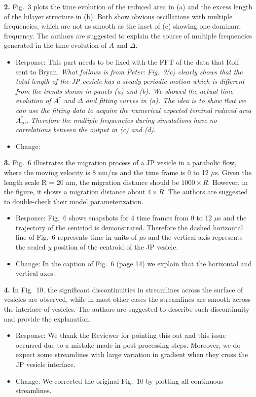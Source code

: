 \documentclass[11pt]{article}
\newcommand{\comment}[1]{{\color{blue} #1}}
\begin{document}
\noindent
\comment{{\bf 2.} Fig.~3 plots the time evolution of the reduced area in (a) and
the excess length of the bilayer structure in (b). Both show obvious
oscillations with multiple frequencies, which are not as smooth as the
inset of (c) showing one dominant frequency. The authors are suggested
to explain the source of multiple frequencies generated in the time
evolution of $A$ and $\Delta$.}
\begin{itemize}
  \item  Response: This part needs to be fixed with the FFT of the data that Rolf sent to Bryan.
  {\sl What follows is from Peter:
  Fig.~3(c) clearly shows that the total length of the JP vesicle has a steady periodic motion 
which is different from the trends shown in panels (a) and (b). We showed the actual time evolution of $A^*$ and $\Delta$ and fitting curves in (a). 
The idea is to show that we can use the fitting data to acquire the numerical expected teminal 
reduced area $A^*_\infty$. Therefore the multiple frequencies during simulations have no correlations between
the output in (c) and (d).}

\item Change: 

\end{itemize}

\noindent
\comment{{\bf 3.} Fig.~6 illustrates the migration process of a JP vesicle in a
parabolic flow, where the moving velocity is 8 nm/ns and the time frame
is 0 to 12 $\mu$s. Given the length scale R = 20 nm, the migration
distance should be $1000 \times R$. However, in the figure, it shows a
migration distance about $4 \times R$. The authors are suggested to
double-check their model parameterization.}
\begin{itemize}
  \item Response: Fig.~6 shows snapshots for 4 time frames from 0 to 12 $\mu$s and the trajectory of the centriod is demonstrated. Therefore the dashed horizontal line of Fig.~6 represents time in units of $\mu$s and the vertical axis represents the scaled $y$ position of the centroid of the JP vesicle.
  \item Change: In the caption of Fig.~6 (page 14) we explain that the horizontal and vertical axes.
  
\end{itemize}

\noindent
\comment{{\bf 4.} In Fig.~10, the significant discontinuities in streamlines
across the surface of vesicles are observed, while in most other cases
the streamlines are smooth across the interface of vesicles. The authors
are suggested to describe such discontinuity and provide the
explanation.}
\begin{itemize}
  \item Response: We thank the Reviewer for pointing this out and this issue occurred due to a mistake made in post-processing
steps. Moreover, we do expect some  streamlines with large variation in gradient when they cross the JP vesicle interface.

\item Change: We corrected the original Fig.~10 by plotting all continuous streamlines. 
\end{itemize}
\end{document}
